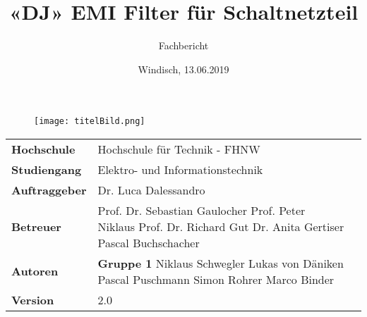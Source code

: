 \documentclass[final]{fhnwreport}       %
\title{«DJ» EMI Filter für Schaltnetzteil}          			%
\author{Fachbericht}  		%
\date{Windisch, 13.06.2019}             		%
\begin{document}
\maketitle

\vspace*{-1cm}						    %
\vfill
\begin{figure}[H]
\centering
\texttt{[image: titelBild.png]}
\end{figure}
\vfill

{
\renewcommand\arraystretch{2}
\begin{center}
\begin{tabular}{ >{\bf} l p{10cm} l }
Hochschule&Hochschule für Technik - FHNW\\
Studiengang&Elektro- und Informationstechnik\\
Auftraggeber&Dr. Luca Dalessandro\\
Betreuer&Prof. Dr. Sebastian Gaulocher \newline Prof. Peter Niklaus \newline Prof. Dr. Richard Gut \newline  Dr. Anita Gertiser \newline Pascal Buchschacher \\
Autoren&\textbf{Gruppe 1} \newline Niklaus Schwegler \newline Lukas von Däniken \newline Pascal Puschmann  \newline Simon Rohrer \newline Marco Binder\\
Version&2.0 %
\end{tabular}
\end{center}
}

\clearpage

\thispagestyle{empty}
			
\end{document}
